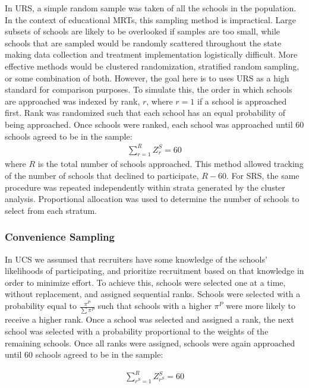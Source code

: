 \documentclass[man,floatsintext]{apa6}
\begin{document}
In URS, a simple random sample was taken of all the schools in the population. In the context of educational MRTs, this sampling method is impractical. Large subsets of schools are likely to be overlooked if samples are too small, while schools that are sampled would be randomly scattered throughout the state making data collection and treatment implementation logistically difficult. More effective methods would be clustered randomization, stratified random sampling, or some combination of both. However, the goal here is to uses URS as a high standard for comparison purposes. To simulate this, the order in which schools are approached was indexed by rank, \(r\), where \(r = 1\) if a school is approached first. Rank was randomized such that each school has an equal probability of being approached. Once schools were ranked, each school was approached until 60 schools agreed to be in the sample:
\begin{align} \label{eq:rankRS}
  \sum_{r=1}^R{Z^S_r} = 60
\end{align}
where \(R\) is the total number of schools approached. This method allowed tracking of the number of schools that declined to participate, \(R - 60\). For SRS, the same procedure was repeated independently within strata generated by the cluster analysis. Proportional allocation was used to determine the number of schools to select from each stratum.

\hypertarget{convenience-sampling}{%
\subsubsection{Convenience Sampling}\label{convenience-sampling}}

In UCS we assumed that recruiters have some knowledge of the schools' likelihoods of participating, and prioritize recruitment based on that knowledge in order to minimize effort. To achieve this, schools were selected one at a time, without replacement, and assigned sequential ranks. Schools were selected with a probability equal to \(\frac{\pi^P}{\sum\pi^P}\) such that schools with a higher \(\pi^P\) were more likely to receive a higher rank. Once a school was selected and assigned a rank, the next school was selected with a probability proportional to the weights of the remaining schools. Once all ranks were assigned, schools were again approached until 60 schools agreed to be in the sample:

\begin{align} \label{eq:rankCS}
  \sum_{r^S=1}^R{Z^S_{r^S} = 60}
\end{align}
\end{document}
